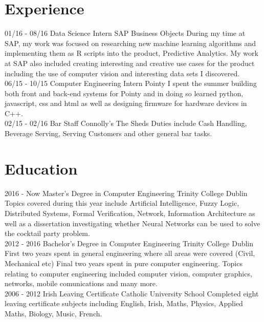\documentclass[]{friggeri-cv}
\begin{document}
\section{Experience}
\begin{entrylist}
  \entry
    {01/16 - 08/16}
    {Data Science Intern}
    {SAP Business Objects}
    {During my time at SAP, my work was focused on researching new machine learning algorithms and implementing them as R scripts into the product, Predictive Analytics. My work at SAP also included creating interesting and creative use cases for the product including the use of computer vision and interesting data sets I discovered.\\}
  \entry
    {06/15 - 10/15}
    {Computer Engineering Intern}
    {Pointy}
    {I spent the summer building both front and back-end systems for Pointy and in doing so learned python, javascript, css and html as well as designing firmware for hardware devices in C++.\\}
    \entry
    {02/15 - 02/16}
    {Bar Staff}
    {Connolly's The Sheds}
    {Duties include Cash Handling, Beverage Serving, Serving Customers and other general bar tasks.\\}
\end{entrylist}

\section{Education}
\begin{entrylist}
  \entry
    {2016 - Now}
    {Master's Degree in Computer Engineering}
    {Trinity College Dublin}
    {Topics covered during this year include Artificial Intelligence, Fuzzy Logic, Distributed Systems, Formal Verification, Network, Information Architecture as well as a dissertation investigating whether Neural Networks can be used to solve the cocktail party problem.\\}
  \entry
    {2012 - 2016}
    {Bachelor's Degree in Computer Engineering}
    {Trinity College Dublin}
    {First two years spent in general engineering where all areas were covered (Civil, Mechanical etc) Final two years spent in pure computer engineering. Topics relating to computer engineering included computer vision, computer graphics, networks, mobile comunications and many more.\\}
  \entry
    {2006 - 2012}
    {Irish Leaving Certificate}
    {Catholic University School}
    {Completed eight leaving certificate subjects including English, Irish, Maths, Physics, Applied Maths, Biology, Music, French.}
\end{entrylist}
\end{document}
